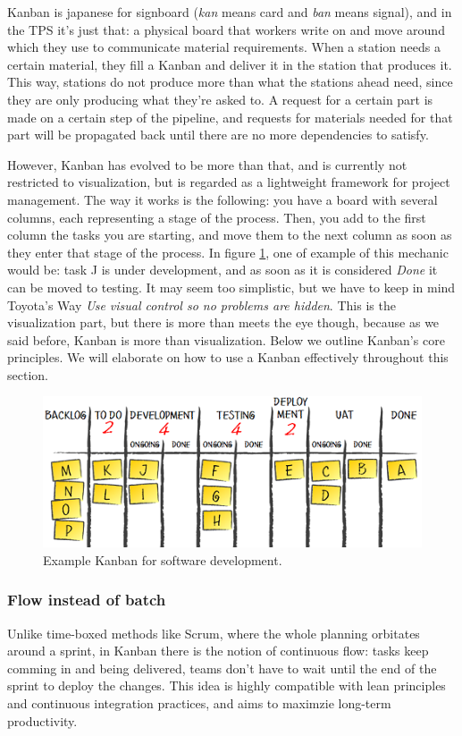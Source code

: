 \documentclass[conference]{IEEEtran}
\begin{document}
Kanban is japanese for signboard (\textit{kan} means card and \textit{ban} means signal)\cite{kanban_def}, and in
the TPS it's just that: a physical board that workers write on and move around
which they use to communicate material requirements. When a station needs a certain
material, they fill a Kanban and deliver it in the station that produces it.
This way, stations do not produce more than what the stations ahead need, since they are
only producing what they're asked to. A request for a certain part is made on a certain
step of the pipeline, and requests for materials needed for that part will be propagated back
until there are no more dependencies to satisfy.

However, Kanban has evolved to be more than that, and is currently not restricted to visualization,
but is regarded as a lightweight framework for project management. The way it works is the
following: you have a board with several columns, each representing a stage of the process.
Then, you add to the first column the tasks you are starting, and move them to the next
column as soon as they enter that stage of the process.
In figure \ref{kanban_dev}, one of example of this mechanic would be: task J is under
development, and as soon as it is considered \textit{Done} it can be moved to testing.
 It may seem too simplistic, but we have to keep in mind Toyota's Way \textit{Use visual control so no problems are
hidden}. This is the visualization part, but there is more than meets the eye though, because as we said before,
Kanban is more than visualization. Below we outline Kanban's core principles.
We will elaborate on how to use a Kanban effectively throughout this section.

\begin{figure}%
\centering
\includegraphics[width=1.0\linewidth]{kanban-board}
\caption{Example Kanban for software development.\cite{kanban_fig}}
\label{kanban_dev}
\end{figure}

\subsubsection{Flow instead of batch}
Unlike time-boxed methods like Scrum, where the whole planning orbitates around
a sprint, in Kanban there is the notion of continuous flow: tasks keep comming
in and being delivered, teams don't have to wait until the end of the sprint
to deploy the changes. This idea is highly compatible with lean principles and
continuous integration practices, and aims to maximzie long-term productivity.
\end{document}
